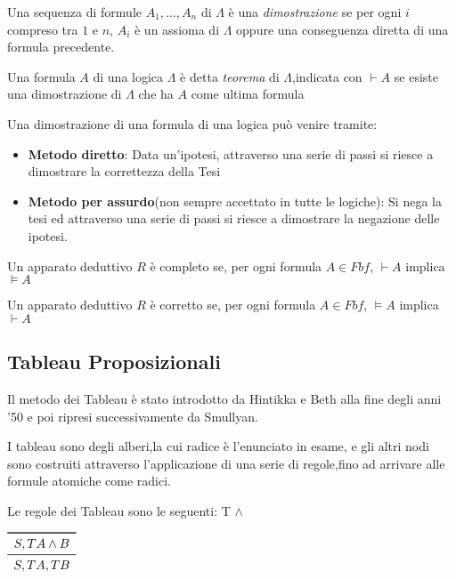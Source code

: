 \begin{defi}
Una sequenza di formule $A_1,\dots,A_n$ di $\Lambda$ è una \emph{dimostrazione} se
per ogni $i$ compreso tra $1$ e $n$, $A_i$ è un assioma di $\Lambda$ oppure una
conseguenza diretta di una formula precedente.
\end{defi}

\begin{defi}
Una formula $A$ di una logica $\Lambda$ è detta \emph{teorema} di $\Lambda$,indicata
con $\vdash A$ se esiste una dimostrazione di $\Lambda$ che ha $A$ come ultima formula
\end{defi}

Una dimostrazione di una formula di una logica può venire tramite:
\begin{itemize}
  \item  \textbf{Metodo diretto}: Data un'ipotesi, attraverso una serie di passi
          si riesce a dimostrare la correttezza della Tesi
  \item \textbf{Metodo per assurdo}(non sempre accettato in tutte le logiche):
        Si nega la tesi ed attraverso una serie di passi si riesce a dimostrare
        la negazione delle ipotesi.
\end{itemize}

\begin{thm}
    Un apparato deduttivo $R$ è completo se, per ogni formula $A \in Fbf$, $\vdash A$
    implica $\models A$
\end{thm}

\begin{thm}
    Un apparato deduttivo $R$ è corretto se, per ogni formula $A \in Fbf$, $\models A$
    implica $\vdash A$
\end{thm}
\subsection{Tableau Proposizionali}
Il metodo dei Tableau è stato introdotto da Hintikka e Beth alla fine degli anni '50
e poi ripresi successivamente da Smullyan.

I tableau sono degli alberi,la cui radice è l'enunciato in esame, e gli altri nodi
sono costruiti attraverso l'applicazione di una serie di regole,fino ad arrivare
alle formule atomiche come radici.

Le regole dei Tableau sono le seguenti:\newline
T $\land$

$\begin{array}{c}
\toprule
S,T A \land B \\
\midrule
S, TA, TB \\
\end{array}$


